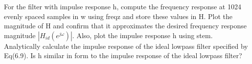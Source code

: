
For the filter with impulse response h, compute the frequency response at 1024 evenly spaced samples in w using freqz and store these values in H. Plot the magnitude of H and confirm that it approximates the desired frequency response magnitude $ |H_{id}(e^{j\omega})|$. Also, plot the impulse response h using stem. Analytically calculate the impulse response of the ideal lowpass filter specified by Eq(6.9). Is h similar in form to the impulse response of the ideal lowpass filter?
